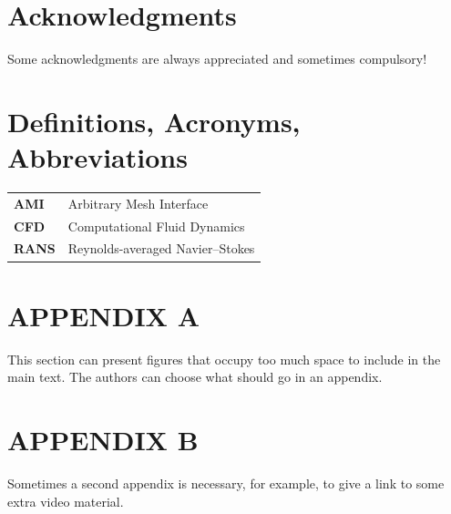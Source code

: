 \documentclass[letterpaper,times]{sae}
\begin{document}
\section{Acknowledgments}
Some acknowledgments are always appreciated and sometimes compulsory! 

\section{Definitions, Acronyms, Abbreviations}

\begin{table}[h]
\centering
\begin{tabular}{L{0.1\textwidth} L{0.33\textwidth}}
\textbf{AMI} & Arbitrary Mesh Interface \\
\textbf{CFD} & Computational Fluid Dynamics \\
\textbf{RANS} & Reynolds-averaged Navier–Stokes \\
\end{tabular}
\end{table}


\onecolumn
\section{APPENDIX A}
\label{sec:figures}
This section can present figures that occupy too much space to include in the main text.
The authors can choose what should go in an appendix.
\clearpage


\section{APPENDIX B} %
\label{sec:video}
\renewcommand{\thefigure}{B\arabic{figure}}
Sometimes a second appendix is necessary, for example, to give a link to some extra video material.
\end{document}
